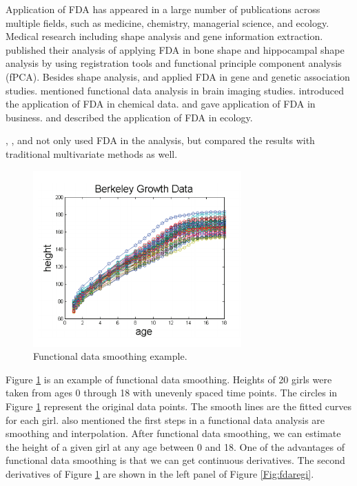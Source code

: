 \documentclass{article}\usepackage[]{graphicx}\usepackage[]{color}
\begin{document}
Application of FDA has appeared in a large number of publications across multiple fields, such as medicine, chemistry, managerial science, and ecology.
Medical research including shape analysis and gene information extraction. 
\citet{epifanio2011functional,epifanio2014hippocampal} published their analysis of applying FDA in bone shape and hippocampal shape analysis by using registration tools and functional principle component analysis (fPCA). Besides shape analysis, \citet{leng2006classification} and \citet{reimherr2014functional} applied FDA in gene and genetic association studies. \citet{tian2010functional} mentioned functional data analysis in brain imaging studies. 
\citet{burfield2015review} introduced the application of FDA in chemical data. 
\citet{dass2012introducing} and \citet{muelas2016facing} gave application of FDA in business. \citet{gorrostieta2014characterization} and \citet{martinez2014air} described the application of FDA in ecology. 


\citet{martinez2014air}, \citet{reimherr2014functional}, and \citet{nikitovic2011functional} not only used FDA in the analysis, but compared the results with traditional multivariate methods as well.

\begin{figure}[!ht]
\centering
\includegraphics[width=8cm]{egsmooth.png}
\caption{Functional data smoothing example. \citep{FDAGiles}}
\label{Fig:fdasmooth}
\end{figure}

Figure \ref{Fig:fdasmooth} is an example of functional data smoothing. Heights of 20 girls were taken from ages 0 through 18 with unevenly spaced time points. The circles in Figure \ref{Fig:fdasmooth} represent the original data points. The smooth lines are the fitted curves for each girl.
\citet{ramsay2006functional} also mentioned the first steps in a functional data analysis are smoothing and interpolation. 
After functional data smoothing, we can estimate the height of a given girl at any age between 0 and 18. One of the advantages of functional data smoothing is that we can get continuous derivatives. The second derivatives of Figure \ref{Fig:fdasmooth} are shown in the left panel of Figure \ref{Fig:fdaregi}.
\end{document}

